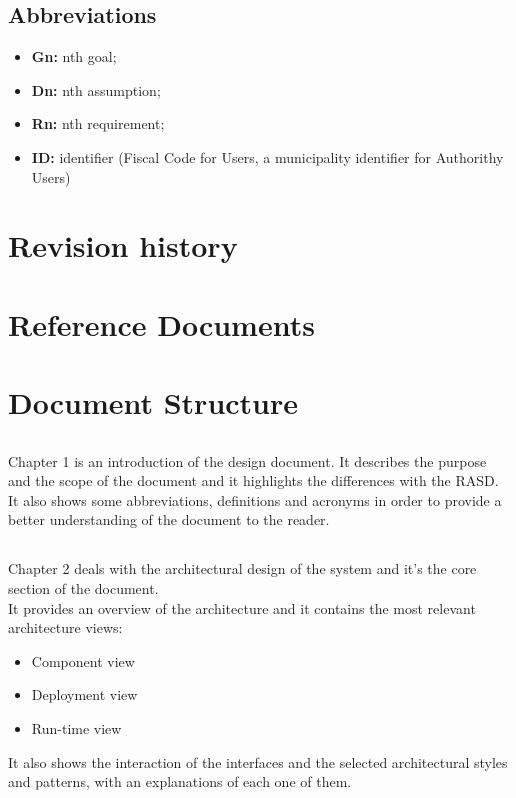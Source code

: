         \subsection{Abbreviations}
        \begin{itemize}            
            \item \textbf{Gn:} nth goal; 
            \item \textbf{Dn:} nth assumption;
            \item \textbf{Rn:} nth requirement; 
            \item \textbf{ID: } identifier (Fiscal Code for Users, a
            municipality identifier for Authorithy Users)
        \end{itemize}
        
    \section{Revision history}
    \section{Reference Documents}
    \section{Document Structure}
        \subsection*{}
        Chapter 1 is an introduction of the design document. It describes the
        purpose and the scope of the document and it highlights the differences
        with the RASD. \\It also shows some abbreviations, definitions and
        acronyms in order to provide a better understanding of the document to
        the reader.

        \subsection*{}
        Chapter 2 deals with the architectural design of the system and it's the
        core section of the document. \\
        It provides an overview of the architecture and it contains the most
        relevant architecture views:
        \begin{itemize}
            \item Component view
            \item Deployment view
            \item Run-time view
        \end{itemize}
        It also shows the interaction of the interfaces and the selected
        architectural styles and patterns, with an explanations of each one of
        them.
                
